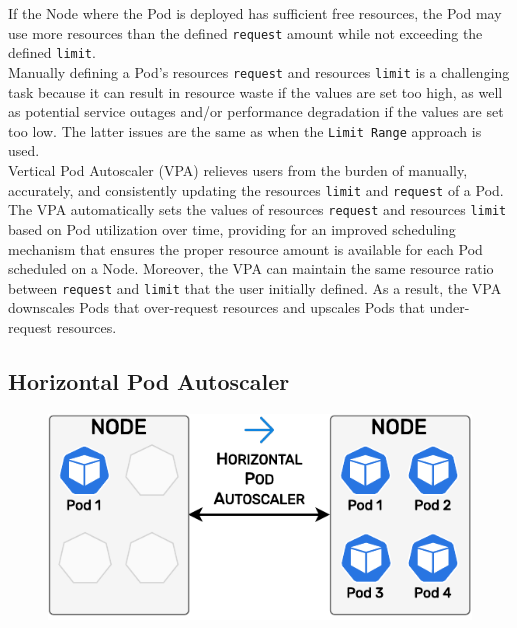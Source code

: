 If the Node where the Pod is deployed has sufficient free resources, the Pod may
use more resources than the defined \texttt{request} amount while not exceeding the
defined \texttt{limit}. \\ %
Manually defining a Pod's resources \texttt{request} and resources \texttt{limit}
is a challenging task because it can result in resource waste if the values are
set too high, as well as potential service outages and/or performance degradation
if the values are set too low. The latter issues are the same as when the
\texttt{Limit Range} approach is used. \\ %
Vertical Pod Autoscaler (VPA) relieves users from the burden of manually,
accurately, and consistently updating the resources \texttt{limit} and \texttt{request}
of a Pod. The VPA automatically sets the values of resources \texttt{request} and
resources \texttt{limit} based on Pod utilization over time, providing for an improved
scheduling mechanism that ensures the proper resource amount is available for each
Pod scheduled on a Node. Moreover, the VPA can maintain the same resource ratio between
\texttt{request} and \texttt{limit} that the user initially defined. As a result,
the VPA downscales Pods that over-request resources and upscales Pods that under-request
resources.

\clearpage


\subsection{Horizontal Pod Autoscaler}
\label{subsec:implementation_autoscaling_horizontal_pod_autoscaler}

\begin{figure}
  \centering
  \includegraphics[width=\linewidth]{
    images/implementation/horizontal_pod_autoscaler.pdf
  }
\end{figure}

